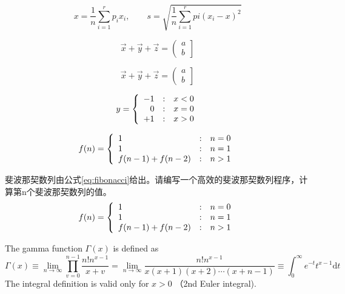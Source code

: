 \documentclass{article}
\begin{document}
    \[ x=\frac{1}{n}\sum_{i=1}^rp_ix_i,\qquad s=\sqrt{\frac{1}{n}\sum_{i=1}^rpi(x_i-x)^2}\]

    \begin{displaymath}
        \vec{x} + \vec{y} + \vec{z}=\left(\begin{array}{c}a \\ b \end{array} \right]
    \end{displaymath}

    \[ \vec{x} + \vec{y} + \vec{z}=\left(\begin{array}{c}a \\ b \end{array} \right] \]


    \begin{displaymath}
        y=\left\{
            \begin{array}{r@{\quad:\quad}l}
                -1 & x<0 \\
                0  & x=0 \\
                +1 & x>0
            \end{array}
        \right.
    \end{displaymath}

    \begin{displaymath}
        f(n)=\left\{
            \begin{array}{l@{\quad:\quad}l}
                1  & n=0 \\
                1  & n=1 \\
                f(n-1) + f(n-2) & n>1
            \end{array}
        \right.
    \end{displaymath}

    斐波那契数列由公式\ref{eq:fibonacci}给出。请编写一个高效的斐波那契数列程序，计算第n个斐波那契数列的值。
    \begin{equation}
        \label{eq:fibonacci}
        f(n)=\left\{
            \begin{array}{l@{\quad:\quad}l}
                1  & n=0 \\
                1  & n=1 \\
                f(n-1) + f(n-2) & n>1
            \end{array}
        \right.
    \end{equation}

    The gamma function $\Gamma(x)$ is defined as
    \begin{displaymath}
        \Gamma(x) \equiv \lim_{n\to\infty} \prod_{v=0}^{n-1} \frac{n!n^{x-1}}{x+v}=\lim_{n\to\infty} \frac{n!n^{x-1}}{x(x+1)(x+2)\cdots(x+n-1)} \equiv \int_0^\infty e^{-t}t^{x-1}\mathrm{d}t
    \end{displaymath}
    The integral definition is valid only for $x>0$ （2nd Euler integral).
\end{document}
